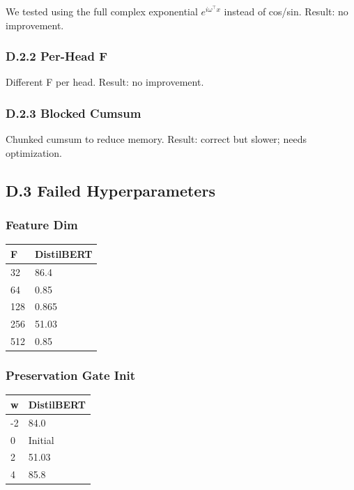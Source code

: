 We tested using the full complex exponential $e^{i \omega^\top x}$ 
instead of cos/sin. Result: no improvement.

\subsubsection{D.2.2 Per-Head F}

Different F per head. Result: no improvement.

\subsubsection{D.2.3 Blocked Cumsum}

Chunked cumsum to reduce memory. Result: correct but slower; needs 
optimization.

\subsection{D.3 Failed Hyperparameters}

\subsubsection{Feature Dim}

\begin{table}[H]
\centering
\small
\begin{tabular}{ll}
\toprule
\textbf{F} & \textbf{DistilBERT} \\
\midrule
32 & 86.4 \\
64 & 0.85 \\
128 & 0.865 \\
256 & 51.03 \\
512 & 0.85 \\
\bottomrule
\end{tabular}
\end{table}

\subsubsection{Preservation Gate Init}

\begin{table}[H]
\centering
\small
\begin{tabular}{ll}
\toprule
\textbf{w} & \textbf{DistilBERT} \\
\midrule
-2 & 84.0 \\
0 & Initial \\
2 & 51.03 \\
4 & 85.8 \\
\bottomrule
\end{tabular}
\end{table}

